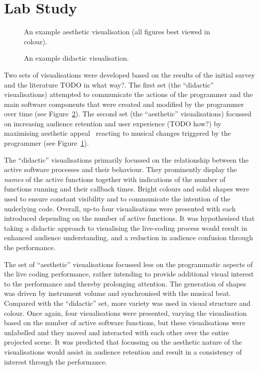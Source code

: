 \documentclass{sig-alternate}
\begin{document}
\section{Lab Study}

\begin{figure}
\centering
{}
\caption{An example aesthetic visualisation (all
  figures best viewed in colour).}
\label{fig:aesthetic-visualisation}
\end{figure}

\begin{figure}
\centering
{}
\caption{An example didactic visualisation.}
\label{fig:didactic-visualisation}
\end{figure}

Two sets of visualisations were developed based on the results of the
initial survey and the literature TODO in what way?. The first set
(the ``didactic'' visualisations) attempted to communicate the actions
of the programmer and the main software components that were created
and modified by the programmer over time (see
Figure~\ref{fig:didactic-visualisation}). The second set (the
``aesthetic'' visualisations) focussed on increasing audience
retention and user experience (TODO how?) by maximising aesthetic
appeal~\cite{Cawthon2007} reacting to musical changes triggered by the
programmer (see Figure~\ref{fig:aesthetic-visualisation}).

The ``didactic'' visualisations primarily focussed on the relationship
between the active software processes and their behaviour. They
prominently display the \emph{names} of the active functions
together with indications of the number of functions running and their
callback times. Bright colours and solid shapes were used to ensure
constant visibility and to communicate the intention of the underlying
code. Overall, up-to four visualisations were presented with each
introduced depending on the number of active functions. It was
hypothesised that taking a didactic approach to visualising the
live-coding process would result in enhanced audience understanding,
and a reduction in audience confusion through the performance.

The set of ``aesthetic'' visualisations focussed less on the
programmatic aspects of the live coding performance, rather intending
to provide additional visual interest to the performance and thereby
prolonging attention. The generation of shapes was driven by
instrument volume and synchronised with the musical beat. Compared
with the ``didactic'' set, more variety was used in visual structure
and colour. Once again, four visualisations were presented, varying
the visualisation based on the number of active software functions,
but these visualisations were unlabelled and they moved and interacted
with each other over the entire projected scene. It was predicted that
focussing on the aesthetic nature of the visualisations would assist
in audience retention and result in a consistency of interest through
the performance.
\end{document}
